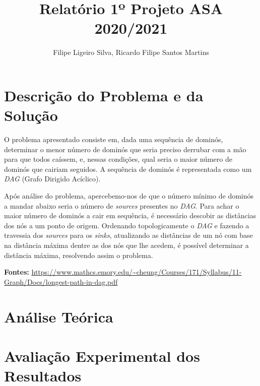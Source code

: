 \documentclass[a4paper, 12pt]{article}
\author{Filipe Ligeiro Silva, Ricardo Filipe Santos Martins}
\title{Relatório 1º Projeto ASA 2020/2021}
\date{}
\begin{document}
\section*{Descrição do Problema e da Solução}
O problema apresentado consiste em, dada uma sequência de dominós, determinar o menor número de dominós que seria preciso derrubar com a mão para que todos caíssem, e, nessas condições, qual seria o maior número de dominós que cairiam seguidos. A sequência de dominós é representada como um \textit{DAG} (Grafo Dirigido Acíclico).

Após análise do problema, apercebemo-nos de que o número mínimo de dominós a mandar abaixo seria o número de \textit{sources} presentes no \textit{DAG}. Para achar o maior número de dominós a cair em sequência, é necessário descobir as distâncias dos nós a um ponto de origem. Ordenando topologicamente o \textit{DAG} e fazendo a travessia dos \textit{sources} para os \textit{sinks}, atualizando as distâncias de um nó com base na distância máxima dentre as dos nós que lhe acedem, é possível determinar a distância máxima, resolvendo assim o problema.

\textbf{Fontes: }
\url{https://www.mathcs.emory.edu/~cheung/Courses/171/Syllabus/11-Graph/Docs/longest-path-in-dag.pdf}
\section*{Análise Teórica}
\section*{Avaliação Experimental dos Resultados}
\end{document}
